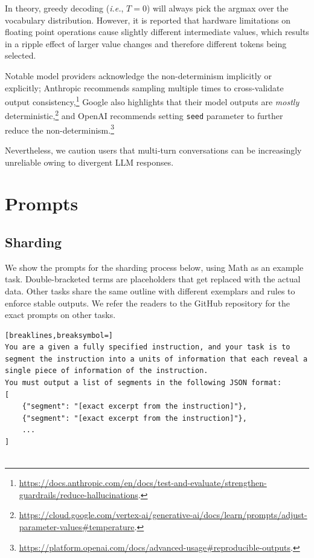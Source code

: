 \documentclass{article}
\begin{document}
\begin{appendices}
In theory, greedy decoding (\textit{i.e.}, $T=0$) will always pick the argmax over the vocabulary distribution.
However, it is reported that hardware limitations on floating point operations cause slightly different intermediate values, which results in a ripple effect of larger value changes and therefore different tokens being selected.

Notable model providers acknowledge the non-determinism implicitly or explicitly; Anthropic recommends sampling multiple times to cross-validate output consistency,\footnote{\url{https://docs.anthropic.com/en/docs/test-and-evaluate/strengthen-guardrails/reduce-hallucinations}.} Google also highlights that their model outputs are \textit{mostly} deterministic,\footnote{\url{https://cloud.google.com/vertex-ai/generative-ai/docs/learn/prompts/adjust-parameter-values\#temperature}.} and OpenAI recommends setting \texttt{seed} parameter to further reduce the non-determinism.\footnote{\url{https://platform.openai.com/docs/advanced-usage\#reproducible-outputs}.}

Nevertheless, we caution users that multi‑turn conversations can be increasingly unreliable owing to divergent LLM responses.

\newpage
\section{Prompts}\label{app:prompts}
\subsection{Sharding}\label{sharding_prompt}
We show the prompts for the sharding process below, using Math as an example task. Double-bracketed terms are placeholders that get replaced with the actual data.
Other tasks share the same outline with different exemplars and rules to enforce stable outputs. We refer the readers to the GitHub repository for the exact prompts on other tasks.
\begin{tcolorbox}[title=Segmentation,float, floatplacement=h]
{\footnotesize
\begin{Verbatim}[breaklines,breaksymbol=]
You are a given a fully specified instruction, and your task is to segment the instruction into a units of information that each reveal a single piece of information of the instruction.
You must output a list of segments in the following JSON format:
[
    {"segment": "[exact excerpt from the instruction]"},
    {"segment": "[exact excerpt from the instruction]"},
    ...
]


\end{Verbatim}}
\end{tcolorbox}
\end{appendices}
\end{document}
